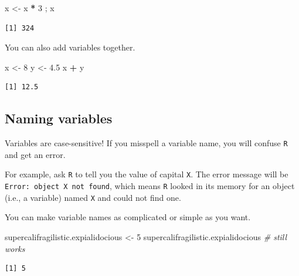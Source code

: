 \documentclass[
]{book}
\newenvironment{Shaded}{\begin{snugshade}}{\end{snugshade}}
\newcommand{\CommentTok}[1]{\textcolor[rgb]{0.56,0.35,0.01}{\textit{#1}}}
\newcommand{\DecValTok}[1]{\textcolor[rgb]{0.00,0.00,0.81}{#1}}
\newcommand{\FloatTok}[1]{\textcolor[rgb]{0.00,0.00,0.81}{#1}}
\newcommand{\NormalTok}[1]{#1}
\newcommand{\OperatorTok}[1]{\textcolor[rgb]{0.81,0.36,0.00}{\textbf{#1}}}
\newcommand{\StringTok}[1]{\textcolor[rgb]{0.31,0.60,0.02}{#1}}
\begin{document}
\begin{Shaded}
\begin{Highlighting}[]
\NormalTok{x <-}\StringTok{ }\NormalTok{x }\OperatorTok{*}\StringTok{ }\DecValTok{3}\NormalTok{ ; x}
\end{Highlighting}
\end{Shaded}

\begin{verbatim}
[1] 324
\end{verbatim}

You can also add variables together.

\begin{Shaded}
\begin{Highlighting}[]
\NormalTok{x <-}\StringTok{ }\DecValTok{8}
\NormalTok{y <-}\StringTok{ }\FloatTok{4.5}
\NormalTok{x }\OperatorTok{+}\StringTok{ }\NormalTok{y}
\end{Highlighting}
\end{Shaded}

\begin{verbatim}
[1] 12.5
\end{verbatim}

\hypertarget{naming-variables}{%
\subsection*{Naming variables}\label{naming-variables}}

Variables are case-sensitive! If you misspell a variable name, you will confuse \texttt{R} and get an error.

For example, ask \texttt{R} to tell you the value of capital \texttt{X}. The error message will be \texttt{Error:\ object\ \textquotesingle{}X\textquotesingle{}\ not\ found}, which means \texttt{R} looked in its memory for an object (i.e., a variable) named \texttt{X} and could not find one.

You can make variable names as complicated or simple as you want.

\begin{Shaded}
\begin{Highlighting}[]
\NormalTok{supercalifragilistic.expialidocious <-}\StringTok{ }\DecValTok{5}
\NormalTok{supercalifragilistic.expialidocious  }\CommentTok{# still works}
\end{Highlighting}
\end{Shaded}

\begin{verbatim}
[1] 5
\end{verbatim}
\end{document}
